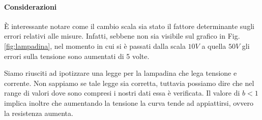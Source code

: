 \paragraph{Considerazioni\\}
È interessante notare come il cambio scala sia stato il fattore determinante sugli errori relativi alle misure. Infatti, sebbene non sia visibile sul grafico in Fig.\ref{fig:lampadina}, nel momento in cui si è passati dalla scala $10V$ a quella $50V$ gli errori sulla tensione sono aumentati di 5 volte.
 
Siamo riusciti ad ipotizzare una legge per la lampadina che lega tensione e corrente. Non sappiamo se tale legge sia corretta, tuttavia possiamo dire che nel range di valori dove sono compresi i nostri dati essa è verificata. Il valore di $b<1$ implica inoltre che aumentando la tensione la curva tende ad appiattirsi, ovvero la resistenza aumenta. 